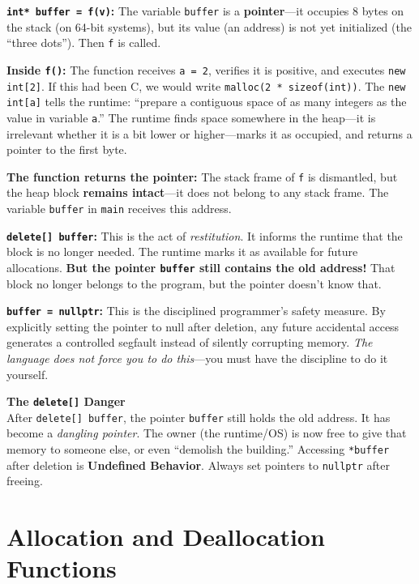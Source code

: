 \textbf{\texttt{int* buffer = f(v)}:} The variable \texttt{buffer} is a \textbf{pointer}---it occupies 8 bytes on the stack (on 64-bit systems), but its value (an address) is not yet initialized (the ``three dots''). Then \texttt{f} is called.

\textbf{Inside \texttt{f()}:} The function receives \texttt{a = 2}, verifies it is positive, and executes \texttt{new int[2]}. If this had been C, we would write \texttt{malloc(2 * sizeof(int))}. The \texttt{new int[a]} tells the runtime: ``prepare a contiguous space of as many integers as the value in variable \texttt{a}.'' The runtime finds space somewhere in the heap---it is irrelevant whether it is a bit lower or higher---marks it as occupied, and returns a pointer to the first byte.

\textbf{The function returns the pointer:} The stack frame of \texttt{f} is dismantled, but the heap block \textbf{remains intact}---it does not belong to any stack frame. The variable \texttt{buffer} in \texttt{main} receives this address.

\textbf{\texttt{delete[] buffer}:} This is the act of \emph{restitution}. It informs the runtime that the block is no longer needed. The runtime marks it as available for future allocations. \textbf{But the pointer \texttt{buffer} still contains the old address!} That block no longer belongs to the program, but the pointer doesn't know that.

\textbf{\texttt{buffer = nullptr}:} This is the disciplined programmer's safety measure. By explicitly setting the pointer to null after deletion, any future accidental access generates a controlled segfault instead of silently corrupting memory. \emph{The language does not force you to do this}---you must have the discipline to do it yourself.

\begin{warningbox}
\textbf{The \texttt{delete[]} Danger} \\
After \texttt{delete[] buffer}, the pointer \texttt{buffer} still holds the old address. It has become a \emph{dangling pointer}. The owner (the runtime/OS) is now free to give that memory to someone else, or even ``demolish the building.'' Accessing \texttt{*buffer} after deletion is \textbf{Undefined Behavior}. Always set pointers to \texttt{nullptr} after freeing.
\end{warningbox}

\section{Allocation and Deallocation Functions}

